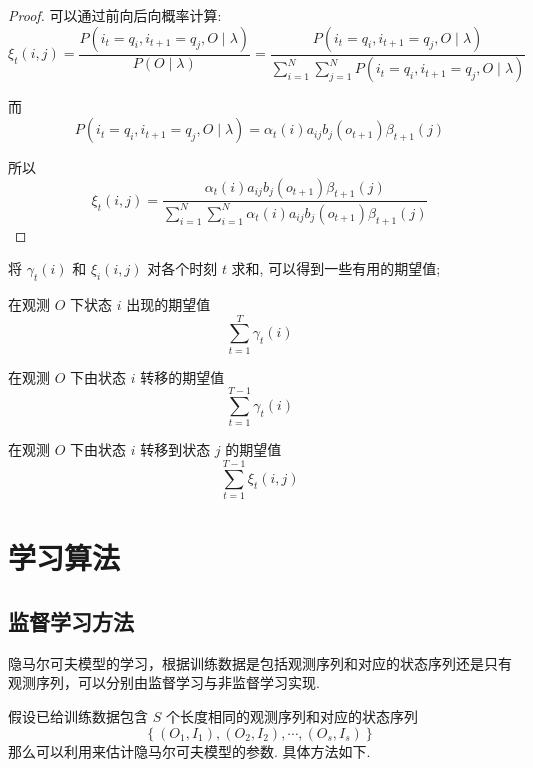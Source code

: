 \begin{proof}
    可以通过前向后向概率计算:
$$
\xi_{t}(i, j)=\frac{P\left(i_{t}=q_{i}, i_{t+1}=q_{j}, O \mid \lambda\right)}{P(O \mid \lambda)}=\frac{P\left(i_{t}=q_{i}, i_{t+1}=q_{j}, O \mid \lambda\right)}{\sum_{i=1}^{N} \sum_{j=1}^{N} P\left(i_{t}=q_{i}, i_{t+1}=q_{j}, O \mid \lambda\right)}
$$

而
$$
P\left(i_{t}=q_{i}, i_{t+1}=q_{j}, O \mid \lambda\right)=\alpha_{t}(i) a_{i j} b_{j}\left(o_{t+1}\right) \beta_{t+1}(j)
$$


所以
$$ \xi_{t}(i, j)=\frac{\alpha_{t}(i) a_{i j} b_{j}\left(o_{t+1}\right) \beta_{t+1}(j)}{\sum_{i=1}^{N} \sum_{i=1}^{N} \alpha_{t}(i) a_{i j} b_{j}\left(o_{t+1}\right) \beta_{t+1}(j)} $$
\end{proof}

将 $ \gamma_{t}(i) $ 和 $ \xi_{i}(i, j) $ 对各个时刻 $ t $ 求和, 可以得到一些有用的期望值;

\begin{theorem}
   在观测 $ O $ 下状态 $ i $ 出现的期望值
$$
\sum_{t=1}^{T} \gamma_{t}(i)
$$ 
\end{theorem}

\begin{theorem}
    在观测 $ O $ 下由状态 $ i $ 转移的期望值
$$
\sum_{t=1}^{T-1} \gamma_{t}(i)
$$
\end{theorem}

\begin{theorem}
    在观测 $ O $ 下由状态 $ i $ 转移到状态 $ j $ 的期望值
$$ \sum_{t=1}^{T-1} \xi_{t}(i, j) $$
\end{theorem}

\section{学习算法}

\subsection{监督学习方法}

隐马尔可夫模型的学习，根据训练数据是包括观测序列和对应的状态序列还是只有观测序列，可以分别由监督学习与非监督学习实现. 

假设已给训练数据包含 $ S $ 个长度相同的观测序列和对应的状态序列 $$ \left\{\left(O_{1}, I_{1}\right),\left(O_{2}, I_{2}\right), \cdots,\left(O_{s}, I_{s}\right)\right\} $$
那么可以利用来估计隐马尔可夫模型的参数. 具体方法如下.

